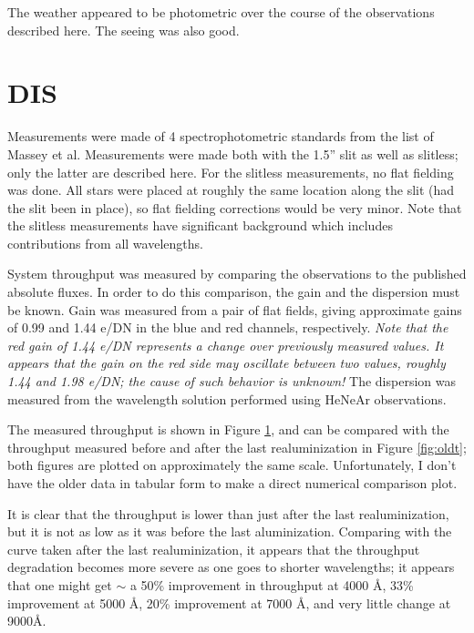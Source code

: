 \documentclass{article}
\begin{document}
The weather appeared to be photometric over the course of the observations
described here. The seeing was also good.

\section{DIS}

Measurements were made of 4 spectrophotometric standards from the list
of Massey et al. Measurements were made both with the 1.5'' slit as well
as slitless; only the latter are described here. For the slitless
measurements, no flat fielding was done.  All stars were placed at
roughly the same location along the slit (had the slit been in place),
so flat fielding corrections would be very minor.  Note that the slitless
measurements have significant background which includes contributions
from all wavelengths.

System throughput was measured by comparing the observations to the
published absolute fluxes. In order to do this comparison, the gain and
the dispersion must be known. Gain was measured from a pair of flat fields,
giving approximate gains of 0.99 and 1.44 e/DN in the blue and red channels,
respectively. \textit{Note that the red gain of 1.44 e/DN represents a change
over previously measured values. It appears that the gain on the red side
may oscillate between two values, roughly 1.44 and 1.98 e/DN; the cause
of such behavior is unknown!} The dispersion was measured from the
wavelength solution performed using HeNeAr observations.

The measured throughput is shown in Figure \ref{fig:t}, and can be compared
with the throughput measured before and after the last realuminization in
Figure \ref{fig:oldt}; both figures are plotted on approximately the same
scale.  Unfortunately, I don't have the older data in tabular form to make
a direct numerical comparison plot. 

It is clear that the throughput is lower than just after the last 
realuminization, but it is not as low as it was before the last aluminization.
Comparing with the curve taken after the last realuminization, it appears that
the throughput degradation becomes more severe as one goes to shorter
wavelengths; it appears that one might get $\sim$ a 50\% improvement in 
throughput at 4000 \AA, 33\% improvement at 5000 \AA,  20\% improvement at 
7000 \AA, and very little change at 9000\AA.

\begin{latexonly}
\newpage
\begin{figure}[h]
\epsfxsize=3.5in
\label{fig:t}
\end{figure}
\end{latexonly}
\begin{htmlonly}
\begin{center}
\end{center}
\end{htmlonly}
\end{document}
